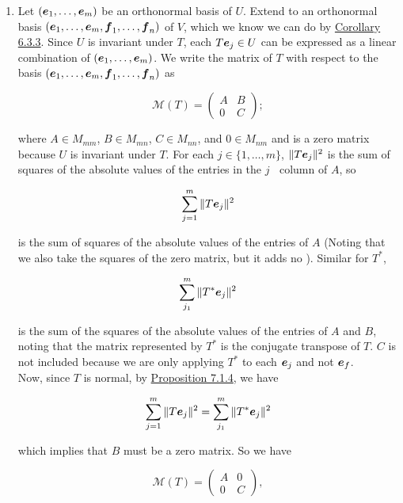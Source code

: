 \documentclass{report}
\DeclareMathOperator{\Th}{^{th}}
\newcommand{\cM}{\mathcal{M}}
\begin{document}
	\begin{myproof} 
		\begin{enumerate}
			\item Let $(\boldsymbol{e}_1,\ldots,\boldsymbol{e}_m)$ be an orthonormal basis of $U$. Extend to an orthonormal basis $(\boldsymbol{e}_1,\ldots,\boldsymbol{e}_m,\boldsymbol{f}_1,\ldots,\boldsymbol{f}_n)$ of $V$, which we know we can do by \hyperref[sec:Cor4]{Corollary 6.3.3}. Since $U$ is invariant under $T$, each $T\boldsymbol{e}_j\in U$ can be expressed as a linear combination of $(\boldsymbol{e}_1,\ldots,\boldsymbol{e}_m)$. We write the matrix of $T$ with respect to the basis $(\boldsymbol{e}_1,\ldots,\boldsymbol{e}_m,\boldsymbol{f}_1,\ldots,\boldsymbol{f}_n)$ as
			
			$$\cM(T)=\begin{pmatrix}
				A & B \\ 0 & C
			\end{pmatrix};$$ 
			
			where $A\in M_{mm}$, $B\in M_{mn}$, $C\in M_{nn}$, and $0\in M_{nm}$ and is a zero matrix because $U$ is invariant under $T$. For each $j\in\{1,\ldots,m\}$, $\|T\boldsymbol{e}_j\|^2$ is the sum of squares of the absolute values of the entries in the $j\Th$ column of $A$, so 
			
			$$\sum_{j=1}^{m}\|T\boldsymbol{e}_j\|^2$$
			
			is the sum of squares of the absolute values of the entries of $A$ (Noting that we also take the squares of the zero matrix, but it adds no ). Similar for $T^*$,
		
			$$\sum_{j_1}^{m}\|T^*\boldsymbol{e}_j\|^2$$
			
			is the sum of the squares of the absolute values of the entries of $A$ and $B$, noting that the matrix represented by $T^*$ is the conjugate transpose of $T$. $C$ is not included because we are only applying $T^*$ to each $\boldsymbol{e}_j$ and not $\boldsymbol{e}_f$.\\
			
			Now, since $T$ is normal, by \hyperref[sec:Prop4]{Proposition 7.1.4}, we have
		
			$$\sum_{j=1}^{m}\|T\boldsymbol{e}_j\|^2=\sum_{j_1}^{m}\|T^*\boldsymbol{e}_j\|^2$$
			
			which implies that $B$ must be a zero matrix. So we have
			
			$$\cM(T)=\begin{pmatrix}
				A & 0 \\ 0 & C
			\end{pmatrix},$$
			

\end{enumerate}
\end{myproof}
\end{document}
